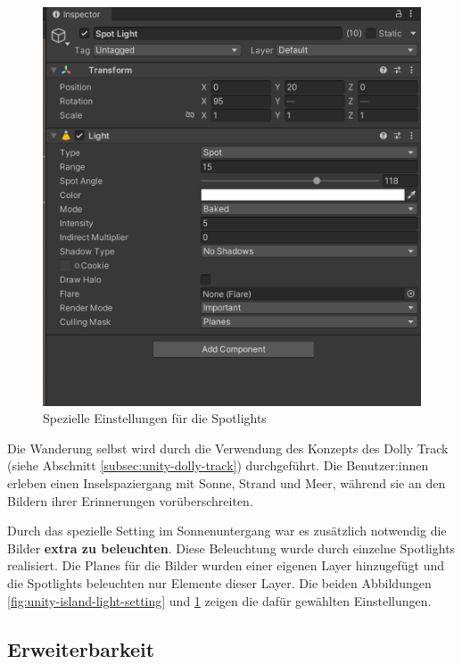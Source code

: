 \begin{figure}
    \vspace{1cm}

    \centering
    \includegraphics[scale=0.15]{pics/unity-island-light-setting-detail.png}
    \caption{Spezielle Einstellungen für die Spotlights}
    \label{fig:unity-island-light-setting-detail}
\end{figure}



Die Wanderung selbst wird durch die Verwendung des Konzepts des Dolly Track (siehe Abschnitt \ref{subsec:unity-dolly-track}) durchgeführt. Die Benutzer:innen erleben einen Inselspaziergang mit Sonne, Strand und Meer, während sie an den Bildern ihrer Erinnerungen vorüberschreiten.



Durch das spezielle Setting im Sonnenuntergang war es zusätzlich notwendig die Bilder \textbf{extra zu beleuchten}. Diese Beleuchtung wurde durch einzelne Spotlights realisiert. Die Planes für die Bilder wurden einer eigenen Layer hinzugefügt und die Spotlights beleuchten nur Elemente dieser Layer. Die beiden Abbildungen \ref{fig:unity-island-light-setting} und \ref{fig:unity-island-light-setting-detail} zeigen die dafür gewählten Einstellungen.


\subsection{Erweiterbarkeit}
\label{subsec:unity-erweiterbarkeit}

